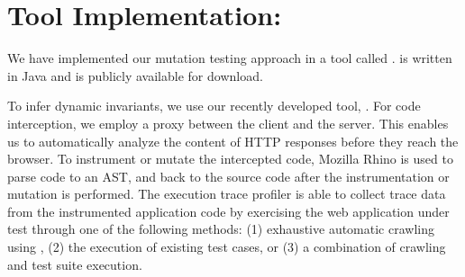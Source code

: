 \section{Tool Implementation: \mutandis} \label{Sec:tool}

We have implemented our \javascript mutation testing approach in a tool called \mutandis. \mutandis is written in Java and is publicly available for download.

To infer \javascript dynamic invariants, we use our recently developed tool, \jsart \cite{mirshokraie:icwe12}.
For \javascript code interception, we employ a proxy between the client and the server. 
This enables us to automatically analyze the content of HTTP responses before they reach the browser. To instrument or mutate the intercepted code, Mozilla Rhino is used to parse \javascript code to an AST, and back to the source code after the instrumentation or mutation is performed.
The execution trace profiler is able to collect trace data from the instrumented application code by exercising the web application under test through one of the following methods: (1) exhaustive automatic crawling using \crawljax \cite{mesbah:tweb11},  (2) the execution of existing test cases, or (3) a combination of crawling and test suite execution.

